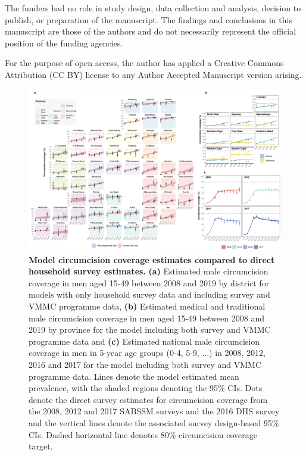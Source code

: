 \documentclass{article}
\begin{document}
The funders had no role in study design, data collection and analysis, decision to publish, or preparation of the manuscript. The findings and conclusions in this manuscript are those of the authors and do not necessarily represent the official position of the funding agencies.

For the purpose of open access, the author has applied a Creative Commons Attribution (CC BY) license to any Author Accepted Manuscript version arising.





\newpage 


\printbibliography

\newpage 

\begin{landscape}
    \begin{figure}[H]
  \centering
  \includegraphics[width = 0.8\linewidth]{Figures/paper/Figure1.pdf}
  \caption{{\bf Model circumcision coverage estimates compared to direct household survey estimates.} {\bf(a)} Estimated male circumcision coverage in men aged 15-49 between 2008 and 2019 by district for models with only household survey data and including survey and VMMC programme data, {\bf(b)} Estimated medical and traditional male circumcision coverage in men aged 15-49 between 2008 and 2019 by province for the model including both survey and VMMC programme data and {\bf(c)} Estimated national male circumcision coverage in men in 5-year age groups (0-4, 5-9, ...) in 2008, 2012, 2016 and 2017 for the model including both survey and VMMC programme data. Lines denote the model estimated mean prevalence, with the shaded regions denoting the 95\% CIs. Dots denote the direct survey estimates for circumcision coverage from the 2008, 2012 and 2017 SABSSM surveys and the 2016 DHS survey and the vertical lines denote the associated survey design-based 95\% CIs. Dashed horizontal line denotes 80\% circumcision coverage target.}
  \label{fig::comparison}
\end{figure}
\end{landscape}
\end{document}
